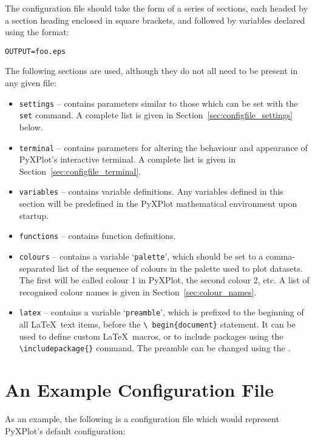 The configuration file should take the form of a series of sections, each
headed by a section heading enclosed in square brackets, and followed by
variables declared using the format:

\begin{verbatim} 
OUTPUT=foo.eps
\end{verbatim}

The following sections are used, although they do not all need to be present in
any given file:

\begin{itemize}
\item {\tt settings} -- contains parameters similar to those which can be set
with the {\tt set} command. A complete list is given in
Section~\ref{sec:configfile_settings} below.
\item {\tt terminal} -- contains parameters for altering the behaviour and
appearance of PyXPlot's interactive terminal. A complete list is given in
Section~\ref{sec:configfile_terminal}.
\item {\tt variables} -- contains variable definitions. Any variables defined
in this section will be predefined in the PyXPlot mathematical environment upon
startup.
\item {\tt functions} -- contains function definitions.
\item {\tt colours} -- contains a variable `{\tt palette}', which should be set
to a comma-separated list of the sequence of colours in the palette used to
plot datasets. The first will be called colour 1 in PyXPlot, the second colour
2, etc. A list of recognised colour names is given in
Section~\ref{sec:colour_names}.
\item {\tt latex} -- contains a variable `{\tt preamble}', which is prefixed to
the beginning of all \LaTeX\ text items, before the {\tt \textbackslash
begin\{document\}} statement. It can be used to define custom \LaTeX\ macros,
or to include packages using the {\tt \textbackslash includepackage\{\}}
command.  The preamble can be changed using the .
\end{itemize}

\section{An Example Configuration File}
\noindent As an example, the following is a configuration file
which would represent PyXPlot's default configuration:

